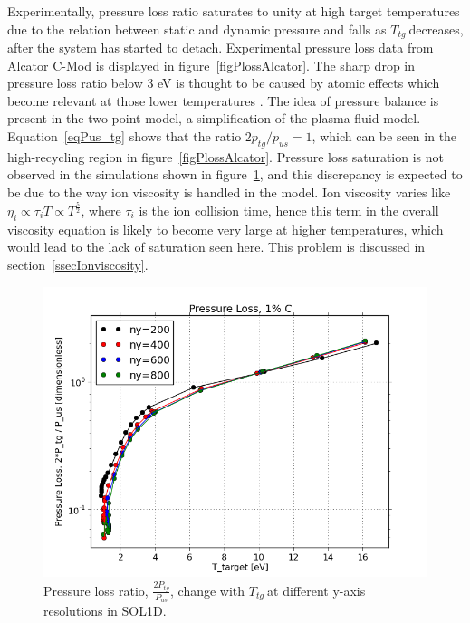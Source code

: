 \documentclass[12pt]{article}  %
\providecommand{\Ttg}{$T_{tg}~$} %
\begin{document}
Experimentally, pressure loss ratio saturates to unity at high target temperatures due to the relation between static and dynamic pressure and falls as \Ttg decreases, after the system has started to detach. Experimental pressure loss data from Alcator C-Mod is displayed in figure~\ref{figPlossAlcator}. The sharp drop in pressure loss ratio below 3 eV is thought to be caused by atomic effects which become relevant at those lower temperatures \cite{Pitcher1999}. The idea of pressure balance is present in the two-point model, a simplification of the plasma fluid model. Equation~\ref{eqPus_tg} shows that the ratio $2p_{tg}/p_{us} = 1$, which can be seen in the high-recycling region in figure~\ref{figPlossAlcator}. Pressure loss saturation is not observed in the simulations shown in figure~\ref{figPL_IMPCOMBO2logy}, and this discrepancy is expected to be due to the way ion viscosity is handled in the model. Ion viscosity varies like $\eta_i \propto \tau_i T \propto T^{\frac{5}{2}}$, where $\tau_i$ is the ion collision time, hence this term in the overall viscosity equation is likely to become very large at higher temperatures, which would lead to the lack of saturation seen here. This problem is discussed in section~\ref{ssecIonviscosity}. 

\begin{figure}
\includegraphics[scale=0.6]{Figures/sol1d/PL_IMPCOMBO2logy.png}
\centering
\caption{Pressure loss ratio, $\frac{2P_{tg}}{P_{us}}$, change with \Ttg at different y-axis resolutions in SOL1D.}\label{figPL_IMPCOMBO2logy}
\end{figure}
\end{document}
